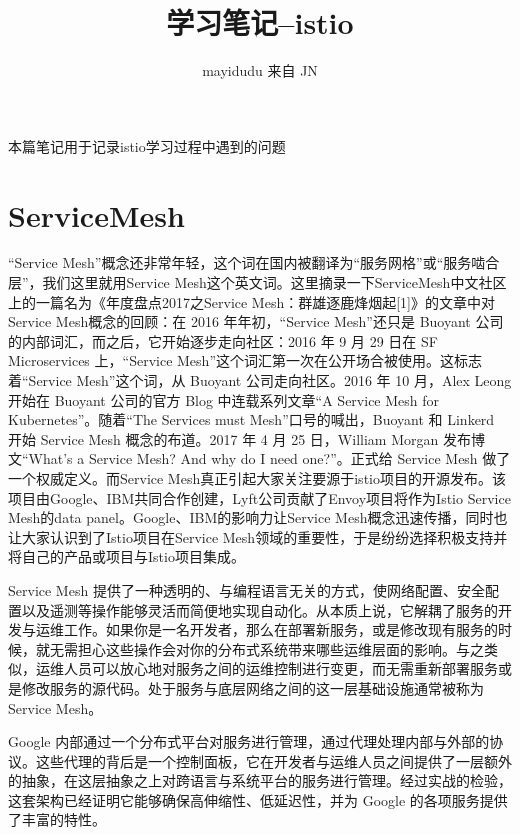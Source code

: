 \documentclass{ctexart}
\newcommand{\jn}{JN}
\begin{document}
\title{学习笔记--istio}
\author{mayidudu 来自 \jn}
\maketitle
\tableofcontents


\begin{center}
	本篇笔记用于记录istio学习过程中遇到的问题
\end{center}
\section{ServiceMesh}
“Service Mesh”概念还非常年轻，这个词在国内被翻译为“服务网格”或“服务啮合层”，我们这里就用Service Mesh这个英文词。这里摘录一下ServiceMesh中文社区上的一篇名为《年度盘点2017之Service Mesh：群雄逐鹿烽烟起[1]》的文章中对Service Mesh概念的回顾：在 2016 年年初，“Service Mesh”还只是 Buoyant 公司的内部词汇，而之后，它开始逐步走向社区：2016 年 9 月 29 日在 SF Microservices 上，“Service Mesh”这个词汇第一次在公开场合被使用。这标志着“Service Mesh”这个词，从 Buoyant 公司走向社区。2016 年 10 月，Alex Leong 开始在 Buoyant 公司的官方 Blog 中连载系列文章“A Service Mesh for Kubernetes”。随着“The Services must Mesh”口号的喊出，Buoyant 和 Linkerd 开始 Service Mesh 概念的布道。2017 年 4 月 25 日，William Morgan 发布博文“What’s a Service Mesh? And why do I need one?”。正式给 Service Mesh 做了一个权威定义。而Service Mesh真正引起大家关注要源于istio项目的开源发布。该项目由Google、IBM共同合作创建，Lyft公司贡献了Envoy项目将作为Istio Service Mesh的data panel。Google、IBM的影响力让Service Mesh概念迅速传播，同时也让大家认识到了Istio项目在Service Mesh领域的重要性，于是纷纷选择积极支持并将自己的产品或项目与Istio项目集成。

Service Mesh 提供了一种透明的、与编程语言无关的方式，使网络配置、安全配置以及遥测等操作能够灵活而简便地实现自动化。从本质上说，它解耦了服务的开发与运维工作。如果你是一名开发者，那么在部署新服务，或是修改现有服务的时候，就无需担心这些操作会对你的分布式系统带来哪些运维层面的影响。与之类似，运维人员可以放心地对服务之间的运维控制进行变更，而无需重新部署服务或是修改服务的源代码。处于服务与底层网络之间的这一层基础设施通常被称为 Service Mesh。


Google 内部通过一个分布式平台对服务进行管理，通过代理处理内部与外部的协议。这些代理的背后是一个控制面板，它在开发者与运维人员之间提供了一层额外的抽象，在这层抽象之上对跨语言与系统平台的服务进行管理。经过实战的检验，这套架构已经证明它能够确保高伸缩性、低延迟性，并为 Google 的各项服务提供了丰富的特性。
\end{document}
